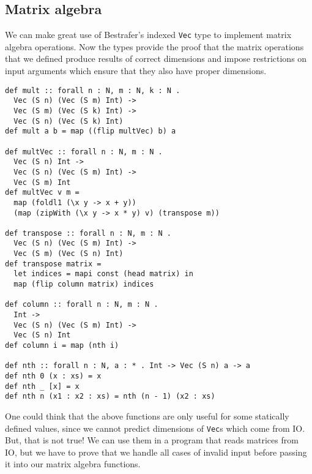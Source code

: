 \documentclass[declaration,shortabstract,english]{iithesis}
\begin{document}
\subsection*{Matrix algebra}
We can make great use of Bestrafer's indexed \verb+Vec+ type to implement matrix algebra operations.
Now the types provide the proof that the matrix operations that we defined produce results of
correct dimensions and impose restrictions on input arguments which ensure that they also have
proper dimensions.
\begin{verbatim}
def mult :: forall n : N, m : N, k : N .
  Vec (S n) (Vec (S m) Int) ->
  Vec (S m) (Vec (S k) Int) ->
  Vec (S n) (Vec (S k) Int)
def mult a b = map ((flip multVec) b) a

def multVec :: forall n : N, m : N .
  Vec (S n) Int ->
  Vec (S n) (Vec (S m) Int) ->
  Vec (S m) Int
def multVec v m =
  map (foldl1 (\x y -> x + y))
  (map (zipWith (\x y -> x * y) v) (transpose m))

def transpose :: forall n : N, m : N .
  Vec (S n) (Vec (S m) Int) ->
  Vec (S m) (Vec (S n) Int)
def transpose matrix =
  let indices = mapi const (head matrix) in
  map (flip column matrix) indices

def column :: forall n : N, m : N .
  Int ->
  Vec (S n) (Vec (S m) Int) ->
  Vec (S n) Int
def column i = map (nth i)

def nth :: forall n : N, a : * . Int -> Vec (S n) a -> a
def nth 0 (x : xs) = x
def nth _ [x] = x
def nth n (x1 : x2 : xs) = nth (n - 1) (x2 : xs)
\end{verbatim}
One could think that the above functions are only useful for some statically defined values,
since we cannot predict dimensions of \verb+Vec+s which come from IO. But, that is not true!
We can use them in a program that reads matrices from IO, but we have to prove that we handle
all cases of invalid input before passing it into our matrix algebra functions.
\end{document}
